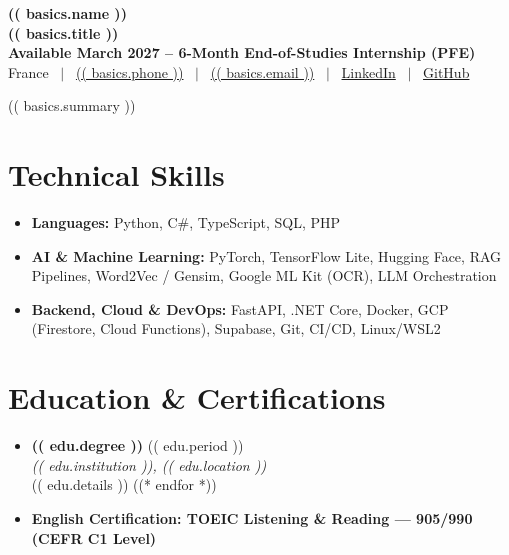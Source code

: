 \documentclass[10pt,a4paper]{article}
\begin{document}
\enlargethispage{3\baselineskip}

\begin{center}
    {\huge \textbf{\color{primary} (( basics.name ))}} \\[0.2em]
    {\large \textbf{(( basics.title ))}} \\[0.2em]
    \textbf{\color{primary} Available March 2027 – 6-Month End-of-Studies Internship (PFE)} \\[0.25em]
    \small
    France \ $|$ \ 
    \href{tel:(( basics.phone ))}{(( basics.phone ))} \ $|$ \ 
    \href{mailto:(( basics.email ))}{(( basics.email ))} \ $|$ \ 
    \href{(( basics.linkedin ))}{LinkedIn} \ $|$ \ 
    \href{(( basics.github ))}{GitHub}
\end{center}

\vspace{-0.5em}
\noindent
\small (( basics.summary ))

\section{Technical Skills}
\begin{itemize}
    \item \textbf{Languages:} Python, C\#, TypeScript, SQL, PHP
    \item \textbf{AI \& Machine Learning:} PyTorch, TensorFlow Lite, Hugging Face, RAG Pipelines, Word2Vec / Gensim, Google ML Kit (OCR), LLM Orchestration
    \item \textbf{Backend, Cloud \& DevOps:} FastAPI, .NET Core, Docker, GCP (Firestore, Cloud Functions), Supabase, Git, CI/CD, Linux/WSL2
\end{itemize}

\section{Education \& Certifications}
\begin{itemize}
((* for edu in education *))
    \item \textbf{(( edu.degree ))} \hfill (( edu.period )) \\
    \textit{(( edu.institution )), (( edu.location ))} \\
    \footnotesize (( edu.details ))
((* endfor *))
    \item \textbf{English Certification: TOEIC Listening \& Reading — 905/990 (CEFR C1 Level)}
\end{itemize}
\end{document}
